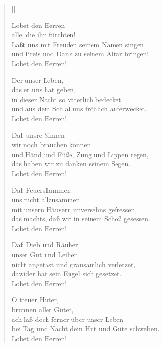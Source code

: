 \begin{multicols}{2}
\settowidth{\versewidth}{und Preis und Dank zu seinem Altar bringen!}
\begin{verse}[\versewidth]

 Lobet den Herren\\
alle, die ihn fürchten!\\
Laßt uns mit Freuden seinem Namen singen\\
und Preis und Dank zu seinem Altar bringen!\\
Lobet den Herren!

 Der unser Leben,\\
das er uns hat geben,\\
in dieser Nacht so väterlich bedecket\\
und aus dem Schlaf uns fröhlich auferwecket.\\
Lobet den Herren!

 Daß unsre Sinnen\\
wir noch brauchen können\\
und Händ und Füße, Zung und Lippen regen,\\
das haben wir zu danken seinem Segen.\\
Lobet den Herren!

 Daß Feuersflammen\\
uns nicht allzusammen\\
mit unsern Häusern unversehns gefressen,\\
das machts, daß wir in seinem Schoß gesessen.\\
Lobet den Herren!

 Daß Dieb und Räuber\\
unser Gut und Leiber\\
nicht angetast und grausamlich verletzet,\\
dawider hat sein Engel sich gesetzet.\\
Lobet den Herren!

 O treuer Hüter,\\
brunnen aller Güter,\\
ach laß doch ferner über unser Leben\\
bei Tag und Nacht dein Hut und Güte schweben.\\
Lobet den Herren!


\end{verse}
\end{multicols}
